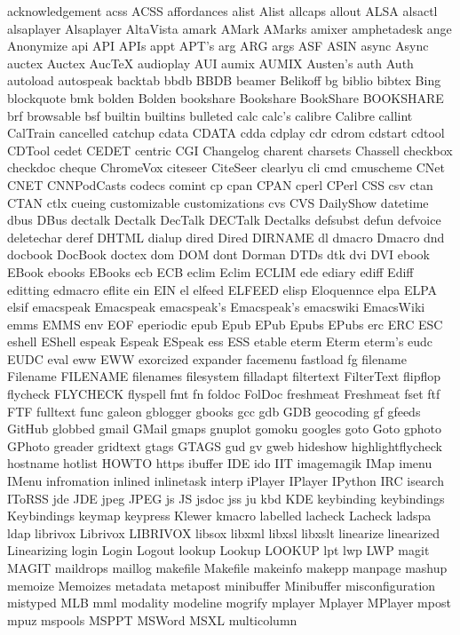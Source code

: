 acknowledgement
acss
ACSS
affordances
alist
Alist
allcaps
allout
ALSA
alsactl
alsaplayer
Alsaplayer
AltaVista
amark
AMark
AMarks
amixer
amphetadesk
ange
Anonymize
api
API
APIs
appt
APT's
arg
ARG
args
ASF
ASIN
async
Async
auctex
Auctex
AucTeX
audioplay
AUI
aumix
AUMIX
Austen's
auth
Auth
autoload
autospeak
backtab
bbdb
BBDB
beamer
Belikoff
bg
biblio
bibtex
Bing
blockquote
bmk
bolden
Bolden
bookshare
Bookshare
BookShare
BOOKSHARE
brf
browsable
bsf
builtin
builtins
bulleted
calc
calc's
calibre
Calibre
callint
CalTrain
cancelled
catchup
cdata
CDATA
cdda
cdplay
cdr
cdrom
cdstart
cdtool
CDTool
cedet
CEDET
centric
CGI
Changelog
charent
charsets
Chassell
checkbox
checkdoc
cheque
ChromeVox
citeseer
CiteSeer
clearlyu
cli
cmd
cmuscheme
CNet
CNET
CNNPodCasts
codecs
comint
cp
cpan
CPAN
cperl
CPerl
CSS
csv
ctan
CTAN
ctlx
cueing
customizable
customizations
cvs
CVS
DailyShow
datetime
dbus
DBus
dectalk
Dectalk
DecTalk
DECTalk
Dectalks
defsubst
defun
defvoice
deletechar
deref
DHTML
dialup
dired
Dired
DIRNAME
dl
dmacro
Dmacro
dnd
docbook
DocBook
doctex
dom
DOM
dont
Dorman
DTDs
dtk
dvi
DVI
ebook
EBook
ebooks
EBooks
ecb
ECB
eclim
Eclim
ECLIM
ede
ediary
ediff
Ediff
editting
edmacro
eflite
ein
EIN
el
elfeed
ELFEED
elisp
Eloquennce
elpa
ELPA
elsif
emacspeak
Emacspeak
emacspeak's
Emacspeak's
emacswiki
EmacsWiki
emms
EMMS
env
EOF
eperiodic
epub
Epub
EPub
Epubs
EPubs
erc
ERC
ESC
eshell
EShell
espeak
Espeak
ESpeak
ess
ESS
etable
eterm
Eterm
eterm's
eudc
EUDC
eval
eww
EWW
exorcized
expander
facemenu
fastload
fg
filename
Filename
FILENAME
filenames
filesystem
filladapt
filtertext
FilterText
flipflop
flycheck
FLYCHECK
flyspell
fmt
fn
foldoc
FolDoc
freshmeat
Freshmeat
fset
ftf
FTF
fulltext
func
galeon
gblogger
gbooks
gcc
gdb
GDB
geocoding
gf
gfeeds
GitHub
globbed
gmail
GMail
gmaps
gnuplot
gomoku
googles
goto
Goto
gphoto
GPhoto
greader
gridtext
gtags
GTAGS
gud
gv
gweb
hideshow
highlightflycheck
hostname
hotlist
HOWTO
https
ibuffer
IDE
ido
IIT
imagemagik
IMap
imenu
IMenu
infromation
inlined
inlinetask
interp
iPlayer
IPlayer
IPython
IRC
isearch
IToRSS
jde
JDE
jpeg
JPEG
js
JS
jsdoc
jss
ju
kbd
KDE
keybinding
keybindings
Keybindings
keymap
keypress
Klewer
kmacro
labelled
lacheck
Lacheck
ladspa
ldap
librivox
Librivox
LIBRIVOX
libsox
libxml
libxsl
libxslt
linearize
linearized
Linearizing
login
Login
Logout
lookup
Lookup
LOOKUP
lpt
lwp
LWP
magit
MAGIT
maildrops
maillog
makefile
Makefile
makeinfo
makepp
manpage
mashup
memoize
Memoizes
metadata
metapost
minibuffer
Minibuffer
misconfiguration
mistyped
MLB
mml
modality
modeline
mogrify
mplayer
Mplayer
MPlayer
mpost
mpuz
mspools
MSPPT
MSWord
MSXL
multicolumn
